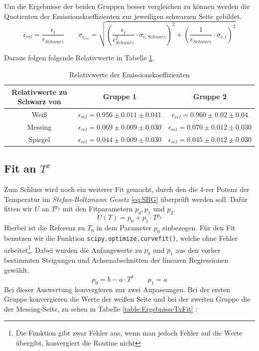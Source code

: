 \documentclass[a4paper, 11pt]{article}
\begin{document}
Um die Ergebnisse der beiden Gruppen besser vergleichen zu können werden die Quotienten der Emissionskoeffizienten zur jeweiligen schwarzen Seite gebildet.
\begin{equation}
\epsilon_{rel}=\frac{\epsilon_i}{\epsilon_{Schwarz}} 
\qquad
\sigma_{\epsilon_{rel}}=\sqrt{\left(\frac{\epsilon_i}{\epsilon_{Schwarz}^2} \cdot  \sigma_{\epsilon,Schwarz}\right) ^2 + \left( \frac{1}{\epsilon_{Schwarz}}\cdot \sigma_{\epsilon,i}\right) ^2}
\end{equation}

Daraus folgen folgende Relativwerte in Tabelle \ref{table:EpsilonRel}.
\begin{table}[H]
\centering
	\begin{tabular}{|c|c|c|}
	\hline Relativwerte zu Schwarz von & Gruppe 1 & Gruppe 2\\
	\hline Weiß & $\epsilon_{rel}=0.956 \pm 0.011 \pm 0.041 $ & $\epsilon_{rel}=0.960 \pm 0.02\pm 0.04$\\
	\hline Messing & $\epsilon_{rel}=0.069 \pm 0.009 \pm 0.030$ & $\epsilon_{rel}= 0.070\pm 0.012 \pm 0.030$\\
	\hline Spiegel & $\epsilon_{rel}=0.044 \pm 0.009 \pm 0.030$ & $\epsilon_{rel}= 0.045\pm 0.012 \pm 0.030$\\
	\hline  
	\end{tabular}
\caption{Relativwerte der Emissionskoeffizienten}
\label{table:EpsilonRel}
\end{table}

\subsection{Fit an $T^x$}
Zum Schluss wird noch ein weiterer Fit gemacht, durch den die 4-rer Potenz der Temperatur im \textit{Stefan-Boltzmann Gesetz} \ref{eq:SBG} überprüft werden soll.
Dafür fitten wir $U$ an $T^{p_2}$ mit den Fitparametern $p_0,p_1$ und $p_2$.
\begin{equation}
U(T) = p_0 + p_1 \cdot T^{p_2}
\end{equation}
Hierbei ist die Referenz zu $T_0$ in dem Parameter $p_0$ einbezogen.
Für den Fit benutzen wir die Funktion \texttt{scipy.optimize.curvefit()}, welche ohne Fehler arbeitet\footnote{Die Funktion gibt zwar Fehler aus, wenn man jedoch Fehler auf die Werte übergibt, konvergiert die Routine nicht}.
Dabei wurden die Anfangswerte zu $p_0$ und $p_1$ aus den vorher bestimmten Steigungen und Achsenabschnitten der linearen Regressionen gewählt.
\begin{equation*}
p_0=b-a\cdot T^4 \qquad p_1=a
\end{equation*}
Bei dieser Auswertung konvergieren nur zwei Anpassungen. Bei der ersten Gruppe konvergieren die Werte der weißen Seite und bei der zweiten Gruppe die der Messing-Seite, zu sehen in Tabelle \ref{table:ErgebnisseTxFit} :
\end{document}
